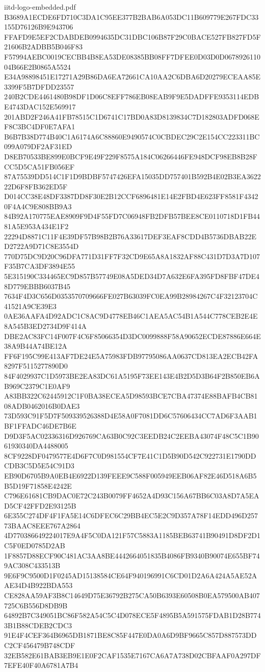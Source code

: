 \begin{filecontents*}[overwrite]{iitd-logo-embedded.pdf}
B3689A1ECDE6FD710C3DA1C95EE377B2BAB6A053DC11B609779E267FDC33155D76126B9E943706
FFAFD9E5EF2CDABDEB0994635DC31DBC106B87F29C0BACE527FB827FD5F21606B2ADBB5B046F83
F57994AEBC0019CECBB4B8EA53DE08385BB08FF7DFEE0D03D0D067892611004B66E2B0865A5524
E34A98898451E17271A29B86DA6EA72661CA10AA2C6DBA6D20279ECEAA85E3399F5B7DFDD23557
240B2CDE4461480B98DF1D06C8EFF786EB08EAB9F9E5DADFFE9353114EDBE4743DAC152E569917
201ABD2F246A41FB78515C1D6741C17BD0A83D8139834C7D182803ADFD068EF8C3BC4DF0E7AFA1
B6B7B38D774B40C1A6174A6C88860E9490574C0CBDEC29C2E154CC223311BC099A079DF2AF31ED
D8EB70533BE899E0BCF9E49F229F8575A184C06266446FE948DCF98EB8B28FCC5D5CA51FB056EF
87A75539DD514C1F1D9BDBF5747426EFA15035DD757401B592B4E02B3EA362222D6F8FB362ED5F
D014CC38E48DF3387DD8F30E2B12CCF6896481E14E2FBD4E623FF8581F43420F4A4C9E808BB9A3
84B92A170775EAE8909F9D4F55FD7C06948FB2DFB57BEE8CE0110718D1FB4481A5E953A434E1F2
22294D8871C11F4E39DF57B98B2B76A33617DEF3EAF8CDD4B5736DBAB22ED2722A9D71C8E3554D
770D75DC9D20C96DFA771D31FF7F32CD9E65A8A1832AF88C431D7D3A7D107F35B7CA3DF3894E55
5E315190C334465EC9D857B57749E08A5DED34D7A632E6FA395FD8FBF47DE48D779EBBB6037B45
7634F4D3C656D0353570709666FE027B63039FC0EA99B28984267C4F32123704C41521A9CE39E3
0AE36AAFA4D92ADC1C8AC9D4778EB46C1AEA5AC54B1A544C778CEB2E4E8A545B3ED2734D9F414A
DBE2AC83FC14F007F4C6F85066354D3DC0099888F58A90652ECDE87886E664E38A9B44A74BE12A
FF6F195C99E413AF7DE24E5A75983FDB97795086AA0637CD813EA2ECB42FA8297F5115277890D0
84F4029937C1D5973BE2EA83DC61A5195F73EE143E4B2D5D3B64F2B850EB6AB969C2379C1E0AF9
A83BB322C62445912C1F0BA38ECEA5D98593BCE7CBA47374E88BAFB4CB8108ADB0462016B0DAE3
73D593C91F5D7F509339526388D4E58A0F7081DD6C57606434CC7AD6F3AAB1BF1FFADC46DE7B6E
D9D3F5AC02336316D926769CA63B0C92C3EEDB24C2EEBA43074F48C5C1B9061930340DA4488005
8CF9228DF0479577E4D6F7C0D981554CF7E41C1D5B90D542C922731E1790DDCDB3C5D5E54C91D3
EB90D6705B9A0EB4E6922D139FEEE9C588F005949EEB06AF82E46D518A6B5B5D19F71858E4242E
C796E61681CB9DAC0E72C243B0079FF4652A4D93C156A67BB6C03A8D7A5EAD5CF42FFD2E93125B
6E355C274DF4F1FA5E14C6DFEC6C29BB4EC5E2C9D357A78F14EDD496D25773BAAC8EEE767A2864
4D770386649224017E9A4F5C0DA121F57C5883A1185BEB63741B90491D8DF2D1C5F0ED0785D2AB
1F8857D88ECF90C481AC3AA8BE4442664051835B4086FB9340B90074E655BF749AC308C433513B
9E6F9C9500D1F0245AD15138584CE64F940196991C6CD01D2A6A424A5AE52AAE34D4B922BDA553
CE828AA59AF3B8C14649D75E36792B275CA50B6393E60508B0EA579500AB407725C6B556D8DB9B
64892B7C349051BC86F582A54C5C4D078ECE5F4895B5A591575FDAB1D28B7743B1B88CDEB2CDC3
91E4F4CEF364B6965DB1871BE8C85F447E0DA0A6D9BF9665C857D887573DDC2CF456479B748CDF
32EB582E61BAB3EB9E1E0F2CAF1535E7167CA6A7A738D02CBFAAF0A297DF7EFE40F40A6781A7B4

\end{filecontents*}
